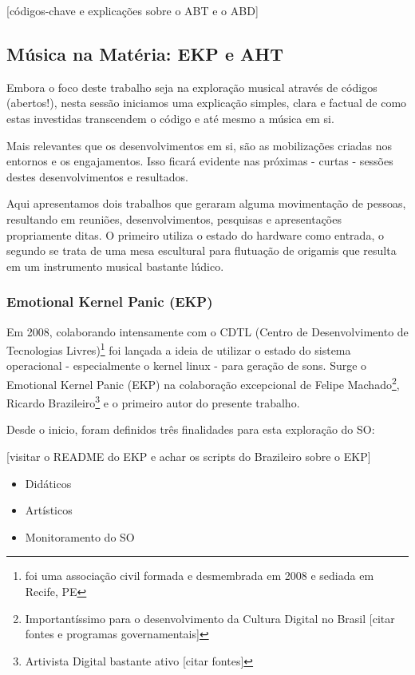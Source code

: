 [códigos-chave e explicações sobre o ABT e o ABD]

\subsection{Música na Matéria: EKP e AHT}
\label{aht}

Embora o foco deste trabalho seja na exploração musical através de
códigos (abertos!), nesta sessão iniciamos uma explicação simples,
clara e factual de como estas investidas transcendem o código e até
mesmo a música em si.

Mais relevantes que os desenvolvimentos em si, são as mobilizações
criadas nos entornos e os engajamentos. Isso ficará evidente nas
próximas - curtas - sessões destes desenvolvimentos e resultados.

Aqui apresentamos dois trabalhos que geraram alguma movimentação de
pessoas, resultando em reuniões, desenvolvimentos, pesquisas e
apresentações propriamente ditas. O primeiro utiliza o estado do
hardware como entrada, o segundo se trata de uma mesa escultural para
flutuação de origamis que resulta em um instrumento musical bastante
lúdico.


\subsubsection{Emotional Kernel Panic (EKP)}

Em 2008, colaborando intensamente com o CDTL (Centro de
Desenvolvimento de Tecnologias Livres)\footnote{foi uma associação
  civil formada e desmembrada em 2008 e sediada em Recife, PE} foi
lançada a ideia de utilizar o estado do sistema operacional -
especialmente o kernel linux - para geração de sons. Surge o Emotional
Kernel Panic (EKP) na colaboração excepcional de Felipe
Machado\footnote{Importantíssimo para o desenvolvimento da Cultura
  Digital no Brasil [citar fontes e programas governamentais]},
Ricardo Brazileiro\footnote{Artivista Digital bastante ativo [citar
    fontes]} e o primeiro autor do presente trabalho.

Desde o inicio, foram definidos três finalidades para esta exploração
do SO:

[visitar o README do EKP e achar os scripts do Brazileiro sobre o EKP]

\begin{itemize}
\item Didáticos
\item Artísticos
\item Monitoramento do SO
\end{itemize}

